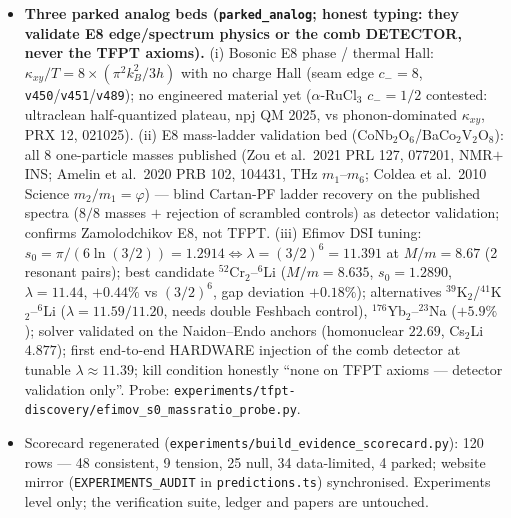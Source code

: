\documentclass[11pt]{article}
\begin{document}
\begin{itemize}[leftmargin=1.5em]
window attenuation $|F(\omega)|=0.033$, $\delta\mu=7.4\times10^{-12}=0.007\sigma$ even at Voyage
2050 --- the theory itself predicts where it is invisible, so NO separate comb-search row is
opened. Shares the \texttt{Nstar\_branch} alternative group with the two $A_s$ rows (one branch
question, several readings). Kill: robust $\mu<0.9\times10^{-8}$ or $>4\times10^{-8}$. Probe:
\texttt{experiments/tfpt-discovery/mu\_distortion\_probe.py}.
\item \textbf{Three parked analog beds (\texttt{parked\_analog}; honest typing: they validate E8
edge/spectrum physics or the comb DETECTOR, never the TFPT axioms).} (i) Bosonic E8 phase /
thermal Hall: $\kappa_{xy}/T=8\times(\pi^2k_B^2/3h)$ with no charge Hall (seam edge $c_-{=}8$,
\texttt{v450}/\texttt{v451}/\texttt{v489}); no engineered material yet ($\alpha$-RuCl$_3$
$c_-{=}1/2$ contested: ultraclean half-quantized plateau, npj QM 2025, vs phonon-dominated
$\kappa_{xy}$, PRX 12, 021025). (ii) E8 mass-ladder validation bed
(CoNb$_2$O$_6$/BaCo$_2$V$_2$O$_8$): all 8 one-particle masses published (Zou et al.\ 2021 PRL 127,
077201, NMR$+$INS; Amelin et al.\ 2020 PRB 102, 104431, THz $m_1$--$m_6$; Coldea et al.\ 2010
Science $m_2/m_1{=}\varphi$) --- blind Cartan-PF ladder recovery on the published spectra ($8/8$
masses $+$ rejection of scrambled controls) as detector validation; confirms Zamolodchikov E8, not
TFPT. (iii) Efimov DSI tuning: $s_0=\pi/(6\ln(3/2))=1.2914\Leftrightarrow\lambda=(3/2)^6=11.391$
at $M/m=8.67$ (2 resonant pairs); best candidate $^{52}$Cr$_2$--$^{6}$Li ($M/m{=}8.635$,
$s_0{=}1.2890$, $\lambda{=}11.44$, $+0.44\%$ vs $(3/2)^6$, gap deviation $+0.18\%$); alternatives
$^{39}$K$_2$/$^{41}$K$_2$--$^{6}$Li ($\lambda=11.59/11.20$, needs double Feshbach control),
$^{176}$Yb$_2$--$^{23}$Na ($+5.9\%$); solver validated on the Naidon--Endo anchors (homonuclear
$22.69$, Cs$_2$Li $4.877$); first end-to-end HARDWARE injection of the comb detector at tunable
$\lambda\approx11.39$; kill condition honestly ``none on TFPT axioms --- detector validation
only''. Probe: \texttt{experiments/tfpt-discovery/efimov\_s0\_massratio\_probe.py}.
\item Scorecard regenerated (\texttt{experiments/build\_evidence\_scorecard.py}): 120 rows --- 48
consistent, 9 tension, 25 null, 34 data-limited, 4 parked; website mirror
(\texttt{EXPERIMENTS\_AUDIT} in \texttt{predictions.ts}) synchronised. Experiments level only; the
verification suite, ledger and papers are untouched.
\end{itemize}
\end{document}
